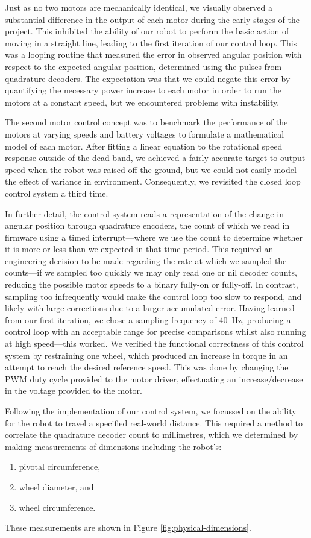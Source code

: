 \documentclass[conference]{IEEEtran}
\begin{document}
Just as no two motors are mechanically identical, we visually observed a substantial difference in the output of each motor during the early stages of the project.
This inhibited the ability of our robot to perform the basic action of moving in a straight line, leading to the first iteration of our control loop.
This was a looping routine that measured the error in observed angular position with respect to the expected angular position, determined using the pulses from quadrature decoders.
The expectation was that we could negate this error by quantifying the necessary power increase to each motor in order to run the motors at a constant speed, but we encountered problems with instability.

The second motor control concept was to benchmark the performance of the motors at varying speeds and battery voltages to formulate a mathematical model of each motor.
After fitting a linear equation to the rotational speed response outside of the dead-band, we achieved a fairly accurate target-to-output speed when the robot was raised off the ground, but we could not easily model the effect of variance in environment.
Consequently, we revisited the closed loop control system a third time.

In further detail, the control system reads a representation of the change in angular position through quadrature encoders, the count of which we read in firmware using a timed interrupt—where we use the count to determine whether it is more or less than we expected in that time period.
This required an engineering decision to be made regarding the rate at which we sampled the counts—if we sampled too quickly we may only read one or nil decoder counts, reducing the possible motor speeds to a binary fully-on or fully-off.
In contrast, sampling too infrequently would make the control loop too slow to respond, and likely with large corrections due to a larger accumulated error.
Having learned from our first iteration, we chose a sampling frequency of \qty{40}{\hertz}, producing a control loop with an acceptable range for precise comparisons whilst also running at high speed—this worked.
We verified the functional correctness of this control system by restraining one wheel, which produced an increase in torque in an attempt to reach the desired reference speed.
This was done by changing the PWM duty cycle provided to the motor driver, effectuating an increase/decrease in the voltage provided to the motor.

Following the implementation of our control system, we focussed on the ability for the robot to travel a specified real-world distance.
This required a method to correlate the quadrature decoder count to millimetres, which we determined by making measurements of dimensions including the robot's:
\begin{enumerate}
	\item pivotal circumference,
	\item wheel diameter, and
	\item wheel circumference.
\end{enumerate}
These measurements are shown in Figure \ref{fig:physical-dimensions}.
\end{document}
